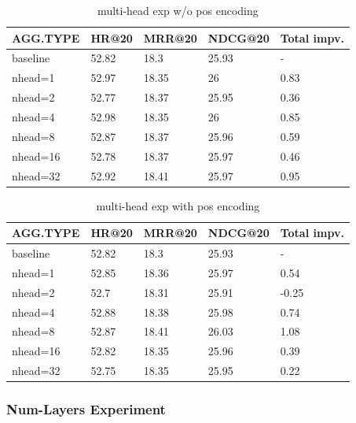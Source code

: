 \documentclass{article}
\begin{document}
\begin{table}
    \caption{multi-head exp w/o pos encoding}
    \label{multi-head exp w/o pos encoding}
    \centering
    \begin{tabular}{lllll}
        \toprule
        AGG.TYPE & HR@20 & MRR@20 & NDCG@20 & Total impv. \\
        \midrule
        baseline & 52.82 & 18.3   & 25.93   & -           \\
        nhead=1  & 52.97 & 18.35  & 26      & 0.83        \\
        nhead=2  & 52.77 & 18.37  & 25.95   & 0.36        \\
        nhead=4  & 52.98 & 18.35  & 26      & 0.85        \\
        nhead=8  & 52.87 & 18.37  & 25.96   & 0.59        \\
        nhead=16 & 52.78 & 18.37  & 25.97   & 0.46        \\
        nhead=32 & 52.92 & 18.41  & 25.97   & 0.95        \\
        \bottomrule
    \end{tabular}
\end{table}

\begin{table}
    \caption{multi-head exp with pos encoding}
    \label{multi-head exp with pos encoding}
    \centering
    \begin{tabular}{lllll}
        \toprule
        AGG.TYPE & HR@20 & MRR@20 & NDCG@20 & Total impv. \\
        \midrule
        baseline & 52.82 & 18.3   & 25.93   & -           \\
        nhead=1  & 52.85 & 18.36  & 25.97   & 0.54        \\
        nhead=2  & 52.7  & 18.31  & 25.91   & -0.25       \\
        nhead=4  & 52.88 & 18.38  & 25.98   & 0.74        \\
        nhead=8  & 52.87 & 18.41  & 26.03   & 1.08        \\
        nhead=16 & 52.82 & 18.35  & 25.96   & 0.39        \\
        nhead=32 & 52.75 & 18.35  & 25.95   & 0.22        \\
        \bottomrule
    \end{tabular}
\end{table}

\subsubsection{Num-Layers Experiment}
\end{document}
